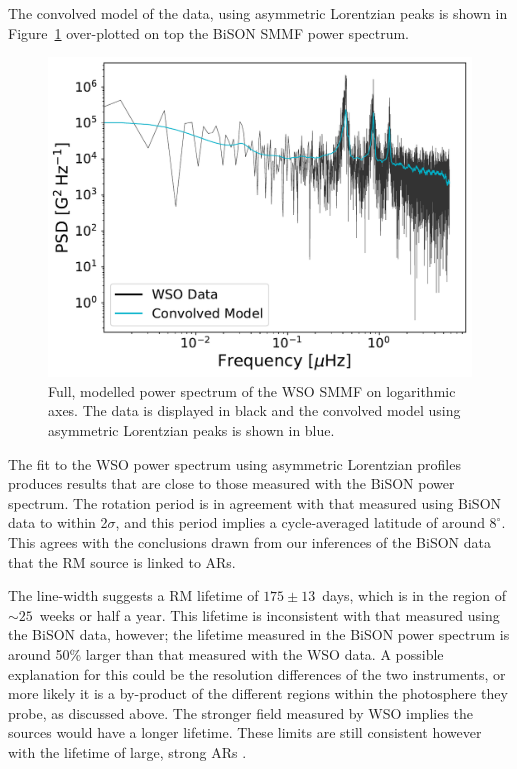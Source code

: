 The convolved model of the data, using asymmetric Lorentzian peaks is shown in Figure~\ref{fig:WSO_PSD_fit} over-plotted on top the BiSON SMMF power spectrum.


\begin{figure}[ht!]
	\centering
	\includegraphics[width=\columnwidth]{WSO_PSD_model.pdf}
	\caption{Full, modelled power spectrum of the WSO SMMF on logarithmic axes. The data is displayed in black and the convolved model using asymmetric Lorentzian peaks is shown in blue.}
	\label{fig:WSO_PSD_fit}
\end{figure}



The fit to the WSO power spectrum using asymmetric Lorentzian profiles produces results that are close to those measured with the BiSON power spectrum. The rotation period is in agreement with that measured using BiSON data to within 2$\sigma$, and this period implies a cycle-averaged latitude of around $8^{\circ}$. This agrees with the conclusions drawn from our inferences of the BiSON data that the RM source is linked to ARs.

The line-width suggests a RM lifetime of $175 \pm 13$~days, which is in the region of $\sim 25$~weeks or half a year. This lifetime is inconsistent with that measured using the BiSON data, however; the lifetime measured in the BiSON power spectrum is around 50\% larger than that measured with the WSO data. A possible explanation for this could be the resolution differences of the two instruments, or more likely it is a by-product of the different regions within the photosphere they probe, as discussed above. The stronger field measured by WSO implies the sources would have a longer lifetime. These limits are still consistent however with the lifetime of large, strong ARs \citep{schrijver_photospheric_1994, van_driel-gesztelyi_evolution_2015}.




